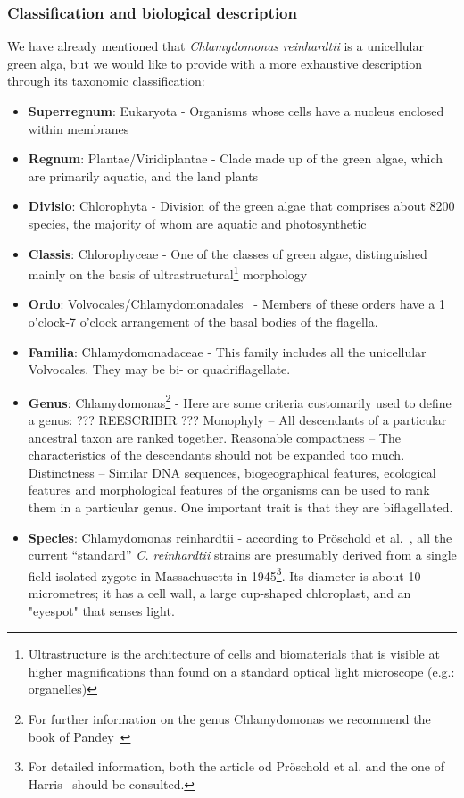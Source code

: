 \subsubsection{Classification and biological description}

We have already mentioned that \textit{Chlamydomonas reinhardtii}
is a unicellular green alga, but we would like to provide with a more exhaustive description through its taxonomic classification: 

\begin{itemize}
	\item \textbf{Superregnum}: Eukaryota - Organisms whose cells have a nucleus enclosed within membranes	
	\item \textbf{Regnum}: Plantae/Viridiplantae - Clade made up of the green algae, which are primarily aquatic, and the land plants
	\item \textbf{Divisio}: Chlorophyta - Division of the green algae that comprises about 8200 species, the majority of whom are aquatic and photosynthetic
	\item \textbf{Classis}: Chlorophyceae - One of the classes of green algae, distinguished mainly on the basis of ultrastructural\footnote{Ultrastructure is the architecture of cells and biomaterials that is visible at higher magnifications than found on a standard optical light microscope (e.g.: organelles)} morphology
	\item \textbf{Ordo}: Volvocales/Chlamydomonadales~\cite{chlorophyceae} - Members of these orders have a 1 o'clock-7 o'clock arrangement of the basal bodies of the flagella.
	\item \textbf{Familia}: Chlamydomonadaceae - This family includes all the unicellular Volvocales. They may be bi- or quadriflagellate.
	\item \textbf{Genus}: Chlamydomonas\footnote{For further information on the genus Chlamydomonas we recommend the book of Pandey~\cite{Pandey}} - Here are some criteria customarily used to define a genus:
	??? REESCRIBIR ???
		\subitem Monophyly – All descendants of a particular ancestral taxon are ranked together.
		\subitem Reasonable compactness – The characteristics of the descendants should not be expanded too much.
		\subitem Distinctness – Similar DNA sequences, biogeographical features, ecological features and morphological features of the organisms can be used to rank them in a particular genus. One important trait is that they are biflagellated.
	\item \textbf{Species}: Chlamydomonas reinhardtii - according to Pröschold et al.~\cite{Proschold}, all the current “standard” \textit{C. reinhardtii} strains are presumably derived from a single field-isolated zygote in Massachusetts in 1945\footnote{For detailed information, both the article od Pröschold et al. and the one of Harris~\cite{Harris} should be consulted.}. Its diameter is about 10 micrometres; it has a cell wall, a large cup-shaped chloroplast, and an "eyespot" that senses light. 
\end{itemize}

